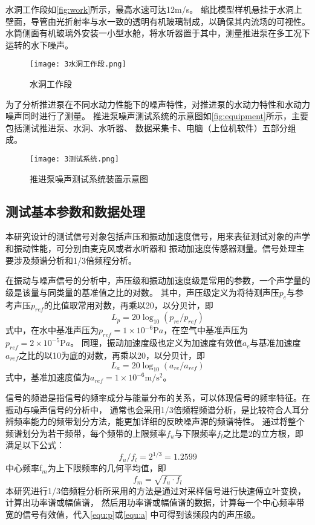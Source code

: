 水洞工作段如\autoref{fig:work}所示，最高水速可达12m/s。
缩比模型样机悬挂于水洞上壁面，导管由光折射率与水一致的透明有机玻璃制成，以确保其内流场的可视性。
水筒侧面有机玻璃外安装一小型水舱，将水听器置于其中，测量推进泵在多工况下运转的水下噪声。
\begin{figure}[htbp]
    \centering
    \texttt{[image: 3水洞工作段.png]}
    \caption{\label{fig:work}水洞工作段}
\end{figure}

为了分析推进泵在不同水动力性能下的噪声特性，对推进泵的水动力特性和水动力噪声同时进行了测量。
推进泵噪声测试系统的示意图如\autoref{fig:equipment}所示，主要包括测试推进泵、水洞、水听器、
数据采集卡、电脑（上位机软件）五部分组成。
\begin{figure}[htbp]
    \centering
    \texttt{[image: 3测试系统.png]}
    \caption{\label{fig:equipment}推进泵噪声测试系统装置示意图}
\end{figure}

\subsection{测试基本参数和数据处理}
本研究设计的测试信号对象包括声压和振动加速度信号，用来表征测试对象的声学和振动性能，可分别由麦克风或者水听器和
振动加速度传感器测量。信号处理主要涉及频谱分析和1/3倍频程分析。

在振动与噪声信号的分析中，声压级和振动加速度级是常用的参数，一个声学量的级是该量与同类量的基准值之比的对数。
其中，声压级定义为将待测声压$p_e$与参考声压$p_{ref}$的比值取常用对数，再乘以20，以分贝计，即
\begin{equation}
    \label{equ:p}
    L_{p} = 20\log_{10}{\left(p_{re}/p_{ref}\right )}
\end{equation}
式中，在水中基准声压为$p_{ref}= 1\times 10^{-6} \mathrm{P} a$，在空气中基准声压为$p_{ref}= 2\times 10^{-5} \mathrm{P} a$。
同理，振动加速度级也定义为加速度有效值$a_e$与基准加速度$a_{ref}$之比的以10为底的对数，再乘以20，以分贝计，即
\begin{equation}
    \label{equ:a}
    L_{a} = 20\log_{10}{\left(a_{re}/a_{ref}\right )}
\end{equation}
式中，基准加速度值为$a_{ref}= 1\times 10^{-6} \mathrm{m/s^2} $。

信号的频谱是指信号的频率成分与能量分布的关系，可以体现信号的频率特征。在振动与噪声信号的分析中，
通常也会采用1/3倍频程频谱分析，是比较符合人耳分辨频率能力的频带划分方法，能更加详细的反映噪声源的频谱特性。
通过将整个频谱划分为若干频带，每个频带的上限频率$f_u$与下限频率$f_l$之比是2的立方根，即满足以下公式：
\begin{equation}
    \label{equ:fu}
    f_{u}/f_{l}=2^{1/3}=1.2599
\end{equation}
中心频率f$_{m}$为上下限频率的几何平均值，即
\begin{equation}
    \label{equ:fm}
    f_{m}=\sqrt{f_{u}\cdot f_{l} } 
\end{equation}
本研究进行1/3倍频程分析所采用的方法是通过对采样信号进行快速傅立叶变换，计算出功率谱或幅值谱，
然后用功率谱或幅值谱的数据，计算每一个中心频率带宽的信号有效值，代入\autoref{equ:p}或\autoref{equ:a}
中可得到该频段内的声压级。
